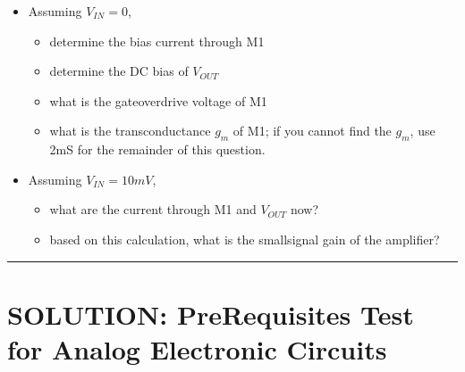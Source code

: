 \documentclass[letterpaper,10pt,english]{jupyterBook}
\begin{document}
\sphinxAtStartPar
{}
\begin{itemize}
\item {} 
\sphinxAtStartPar
Assuming \(V_{IN} = 0\),
\begin{itemize}
\item {} 
\sphinxAtStartPar
determine the bias current through M1

\item {} 
\sphinxAtStartPar
determine the DC bias of \(V_{OUT}\)

\item {} 
\sphinxAtStartPar
what is the gate\sphinxhyphen{}overdrive voltage of M1

\item {} 
\sphinxAtStartPar
what is the transconductance \(g_m\) of M1; if you cannot find the \(g_m\), use 2mS for the remainder of this question.

\end{itemize}

\item {} 
\sphinxAtStartPar
Assuming \(V_{IN} = 10mV\),
\begin{itemize}
\item {} 
\sphinxAtStartPar
what are the current through M1 and \(V_{OUT}\) now?

\item {} 
\sphinxAtStartPar
based on this calculation, what is the small\sphinxhyphen{}signal gain of the amplifier?

\end{itemize}

\end{itemize}


\bigskip\hrule\bigskip


\sphinxstepscope


\chapter{SOLUTION: Pre\sphinxhyphen{}Requisites Test for Analog Electronic Circuits}
\label{\detokenize{TestYourKnowledge/AEC_prereq_solution/AEC_entry_test_solution:solution-pre-requisites-test-for-analog-electronic-circuits}}\label{\detokenize{TestYourKnowledge/AEC_prereq_solution/AEC_entry_test_solution::doc}}
\end{document}
